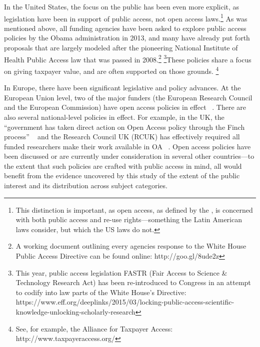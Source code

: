 In the United States, the focus on the public has been even more explicit, as legislation have been in support of public access, not open access laws.\footnote{This distinction is important, as open access, as defined by the  \citet{BOAI2002}, is concerned with both public access and re-use rights—something the Latin American laws consider, but which the US laws do not.} As was mentioned above, all funding agencies have been asked to explore public access policies by the Obama administration in 2013, and many have already put forth proposals that are largely modeled after the pioneering National Institute of Health Public Access law that was passed in 2008.\footnote{A working document outlining every agencies response to the White House Public Access Directive can be found online: http:\slash \slash goo.gl\slash 8ude2z} \footnote{This year, public access legislation FASTR (Fair Access to Science \& Technology Research Act) has been re-introduced to Congress in an attempt to codify into law parts of the White House's Directive: https:\slash \slash www.eff.org\slash deeplinks\slash 2015\slash 03\slash locking-public-access-scientific-knowledge-unlocking-scholarly-research}These policies share a focus on giving taxpayer value, and are often supported on those grounds. \footnote{See, for example, the Alliance for Taxpayer Access: http:\slash \slash www.taxpayeraccess.org\slash }

In Europe, there have been significant legislative and policy advances. At the European Union level, two of the major funders (the European Research Council and the European Commission) have open access policies in effect ~\citep{UNESCO_GOAP_EU_NA}. There are also several national-level policies in effect. For example, in the UK, the ``government has taken direct action on Open Access policy through the Finch process'' ~\citep[n.p.]{UNESCO_GOAL_UK} and the Research Council UK (RCUK) has effectively required all funded researchers make their work available in OA ~\citep{UNESCO_GOAL_UK}. Open access policies have been discussed or are currently under consideration in several other countries—to the extent that such policies are crafted with public access in mind, all would benefit from the evidence uncovered by this study of the extent of the public interest and its distribution across subject categories.

